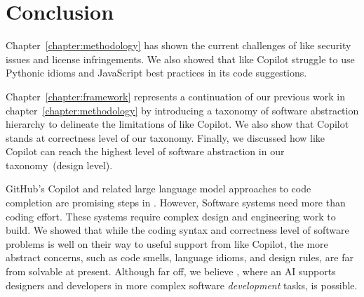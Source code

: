 \section{Conclusion}
\label{conclusion}


Chapter~\ref{chapter:methodology} has shown the current challenges of \cct{} like security issues and license infringements. 
We also showed that \cct{} like Copilot struggle to use Pythonic idioms and JavaScript best practices in its code suggestions.

Chapter~\ref{chapter:framework} represents a continuation of our previous work in chapter~\ref{chapter:methodology} by introducing a taxonomy of software abstraction hierarchy to delineate the limitations of \cct{} like Copilot. We also show that Copilot stands at correctness level of our taxonomy.
Finally, we discussed how \cct{} like Copilot can reach the highest level of software abstraction in our taxonomy~(design level). 

GitHub's Copilot and related large language model approaches to code completion are promising steps in \AISE{}.
However, Software systems need more than coding effort. 
These systems require complex design and engineering work to build. 
We showed that while the coding syntax and correctness level of software problems is well on their way to useful support from \cct{} like Copilot, the more abstract concerns, such as code smells, language idioms, and design rules, are far from solvable at present.
Although far off, we believe \AISE{}, where an AI supports designers and developers in more complex software \emph{development} tasks, is possible.
